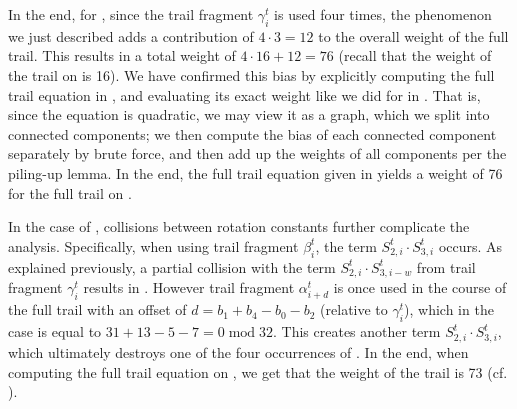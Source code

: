 \documentclass{llncs}
\begin{document}
In the end, for , since the trail fragment $\gamma^t_i$ is used four times, the phenomenon we just described adds a contribution of $4 \cdot 3 = 12$ to the overall weight of the full trail. This results in a total weight of $4 \cdot 16 + 12 = 76$ (recall that the weight of the trail on  is 16). We have confirmed this bias by explicitly computing the full trail equation in , and evaluating its exact weight like we did for  in . That is, since the equation is quadratic, we may view it as a graph, which we split into connected components; we then compute the bias of each connected component separately by brute force, and then add up the weights of all components per the piling-up lemma. In the end, the full trail equation given in  yields a weight of 76 for the full trail on .

In the case of , collisions between rotation constants further complicate the analysis. Specifically, when using trail fragment $\beta^t_i$, the term $S^t_{2,i} \cdot S^t_{3,i}$ occurs. As explained previously, a partial collision with the term $S^t_{2,i} \cdot S^t_{3,i-w}$ from trail fragment $\gamma^t_i$ results in . However trail fragment $\alpha^t_{i+d}$ is once used in the course of the full trail with an offset of $d = b_1+b_4-b_0-b_2$ (relative to $\gamma^t_i$), which in the case  is equal to $31+13-5-7 = 0 \;\text{mod}\; 32$. This creates another term $S^t_{2,i} \cdot S^t_{3,i}$, which ultimately destroys one of the four occurrences of . In the end, when computing the full trail equation on , we get that the weight of the trail is 73 (cf. ).

\end{document}
